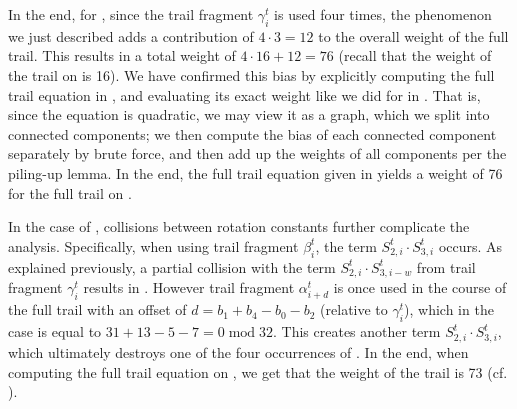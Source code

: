 \documentclass{llncs}
\begin{document}
In the end, for , since the trail fragment $\gamma^t_i$ is used four times, the phenomenon we just described adds a contribution of $4 \cdot 3 = 12$ to the overall weight of the full trail. This results in a total weight of $4 \cdot 16 + 12 = 76$ (recall that the weight of the trail on  is 16). We have confirmed this bias by explicitly computing the full trail equation in , and evaluating its exact weight like we did for  in . That is, since the equation is quadratic, we may view it as a graph, which we split into connected components; we then compute the bias of each connected component separately by brute force, and then add up the weights of all components per the piling-up lemma. In the end, the full trail equation given in  yields a weight of 76 for the full trail on .

In the case of , collisions between rotation constants further complicate the analysis. Specifically, when using trail fragment $\beta^t_i$, the term $S^t_{2,i} \cdot S^t_{3,i}$ occurs. As explained previously, a partial collision with the term $S^t_{2,i} \cdot S^t_{3,i-w}$ from trail fragment $\gamma^t_i$ results in . However trail fragment $\alpha^t_{i+d}$ is once used in the course of the full trail with an offset of $d = b_1+b_4-b_0-b_2$ (relative to $\gamma^t_i$), which in the case  is equal to $31+13-5-7 = 0 \;\text{mod}\; 32$. This creates another term $S^t_{2,i} \cdot S^t_{3,i}$, which ultimately destroys one of the four occurrences of . In the end, when computing the full trail equation on , we get that the weight of the trail is 73 (cf. ).

\end{document}
